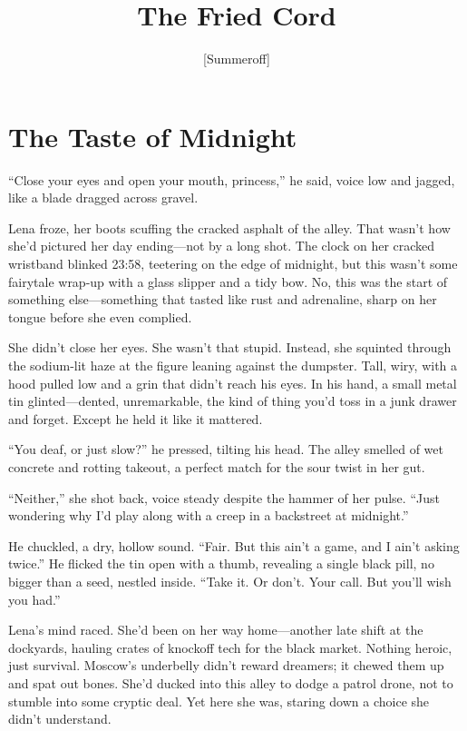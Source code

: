 \documentclass[12pt]{book}
\title{The Fried Cord}
\author{[Summeroff]}
\date{}
\begin{document}
\maketitle
\tableofcontents

\chapter{The Taste of Midnight}

``Close your eyes and open your mouth, princess,'' he said, voice low and jagged, like a blade dragged across gravel.

Lena froze, her boots scuffing the cracked asphalt of the alley. That wasn't how she'd pictured her day ending---not by a long shot. The clock on her cracked wristband blinked 23:58, teetering on the edge of midnight, but this wasn't some fairytale wrap-up with a glass slipper and a tidy bow. No, this was the start of something else---something that tasted like rust and adrenaline, sharp on her tongue before she even complied.

She didn't close her eyes. She wasn't that stupid. Instead, she squinted through the sodium-lit haze at the figure leaning against the dumpster. Tall, wiry, with a hood pulled low and a grin that didn't reach his eyes. In his hand, a small metal tin glinted---dented, unremarkable, the kind of thing you'd toss in a junk drawer and forget. Except he held it like it mattered.

``You deaf, or just slow?'' he pressed, tilting his head. The alley smelled of wet concrete and rotting takeout, a perfect match for the sour twist in her gut.

``Neither,'' she shot back, voice steady despite the hammer of her pulse. ``Just wondering why I'd play along with a creep in a backstreet at midnight.''

He chuckled, a dry, hollow sound. ``Fair. But this ain't a game, and I ain't asking twice.'' He flicked the tin open with a thumb, revealing a single black pill, no bigger than a seed, nestled inside. ``Take it. Or don't. Your call. But you'll wish you had.''

Lena's mind raced. She'd been on her way home---another late shift at the dockyards, hauling crates of knockoff tech for the black market. Nothing heroic, just survival. Moscow's underbelly didn't reward dreamers; it chewed them up and spat out bones. She'd ducked into this alley to dodge a patrol drone, not to stumble into some cryptic deal. Yet here she was, staring down a choice she didn't understand.
\end{document}
